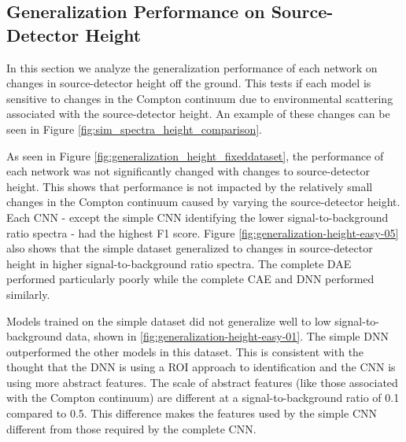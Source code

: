 \subsection{Generalization Performance on Source-Detector Height}

In this section we analyze the generalization performance of each network on changes in source-detector height off the ground. This tests if each model is sensitive to changes in the Compton continuum due to environmental scattering associated with the source-detector height. An example of these changes can be seen in Figure \ref{fig:sim_spectra_height_comparison}.

As seen in Figure \ref{fig:generalization_height_fixeddataset}, the performance of each network was not significantly changed with changes to source-detector height. This shows that performance is not impacted by the relatively small changes in the Compton continuum caused by varying the source-detector height. Each CNN - except the simple CNN identifying the lower signal-to-background ratio spectra - had the highest F1 score. Figure \ref{fig:generalization-height-easy-05} also shows that the simple dataset generalized to changes in source-detector height in higher signal-to-background ratio spectra. The complete DAE performed particularly poorly while the complete CAE and DNN performed similarly.

Models trained on the simple dataset did not generalize well to low signal-to-background data, shown in \ref{fig:generalization-height-easy-01}. The simple DNN outperformed the other models in this dataset. This is consistent with the thought that the DNN is using a ROI approach to identification and the CNN is using more abstract features. The scale of abstract features (like those associated with the Compton continuum) are different at a signal-to-background ratio of 0.1 compared to 0.5. This difference makes the features used by the simple CNN different from those required by the complete CNN.


